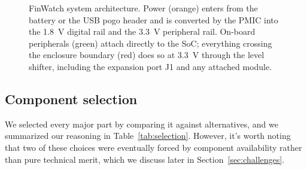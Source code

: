 \documentclass[12pt, a4paper]{article}
\begin{document}
\begin{figure}[H]
\caption{FinWatch system architecture. Power (orange) enters from the battery or the USB pogo header and is converted by the PMIC into the \SI{1.8}{\volt} digital rail and the \SI{3.3}{\volt} peripheral rail. On-board peripherals (green) attach directly to the SoC; everything crossing the enclosure boundary (red) does so at \SI{3.3}{\volt} through the level shifter, including the expansion port J1 and any attached module.}
\label{fig:block}
\end{figure}

\newpage

\subsection{Component selection}
We selected every major part by comparing it against alternatives, and we summarized our reasoning in Table~\ref{tab:selection}. However, it's worth noting that two of these choices were eventually forced by component availability rather than pure technical merit, which we discuss later in Section~\ref{sec:challenges}.
\end{document}
